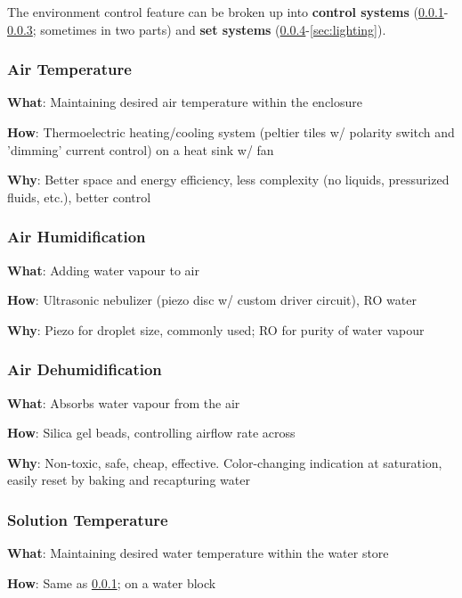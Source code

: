 \documentclass{report}
\begin{document}
The environment control feature can be broken up into \textbf{control systems} (\ref{sec:airtemp}-\ref{sec:dehum}; sometimes in two parts) and \textbf{set systems} (\ref{sec:watertemp}-\ref{sec:lighting}).

\subsubsection{Air Temperature}
\label{sec:airtemp}

\textbf{What}: Maintaining desired air temperature within the enclosure

\textbf{How}: Thermoelectric heating/cooling system (peltier tiles w/ polarity switch and 'dimming' current control) on a heat sink w/ fan

\textbf{Why}: Better space and energy efficiency, less complexity (no liquids, pressurized fluids, etc.), better control

\subsubsection{Air Humidification}
\label{sec:airhum}

\textbf{What}: Adding water vapour to air

\textbf{How}: Ultrasonic nebulizer (piezo disc w/ custom driver circuit), RO water

\textbf{Why}: Piezo for droplet size, commonly used; RO for purity of water vapour

\subsubsection{Air Dehumidification}
\label{sec:dehum}

\textbf{What}: Absorbs water vapour from the air

\textbf{How}: Silica gel beads, controlling airflow rate across

\textbf{Why}: Non-toxic, safe, cheap, effective. Color-changing indication at saturation, easily reset by baking and recapturing water

\subsubsection{Solution Temperature}
\label{sec:watertemp}

\textbf{What}: Maintaining desired water temperature within the water store

\textbf{How}: Same as \ref{sec:airtemp}; on a water block
\end{document}
